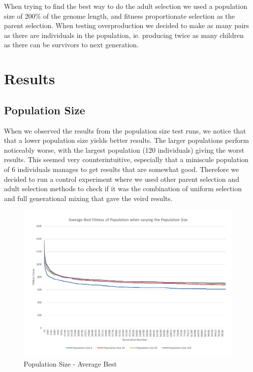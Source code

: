 When trying to find the best way to do the adult selection we used a population size of 200\% of the genome length, and fitness proportionate selection as the parent selection. When testing overproduction we decided to make as many pairs as there are individuals in the population, ie. producing twice as many children as there can be survivors to next generation.

\clearpage

\section{Results} %
\label{sec:results}

\subsection{Population Size} %
\label{sub:population_size}

When we observed the results from the population size test runs, we notice that that a lower population size yields better results. The larger populations perform noticeably worse, with the largest population (120 individuals) giving the worst results. This seemed very counterintuitive, especially that a miniscule population of 6 individuals manages to get results that are somewhat good. Therefore we decided to run a control experiment where we used other parent selection and adult selection methods to check if it was the combination of uniform selection and full generational mixing that gave the veird results.

\begin{figure}[thbp]
	\centerline{\includegraphics[width=\paperwidth]{figures/CircleTests/CircleTestsPopulationAverageBest.pdf}}
	\caption{Population Size - Average Best}
\end{figure}

